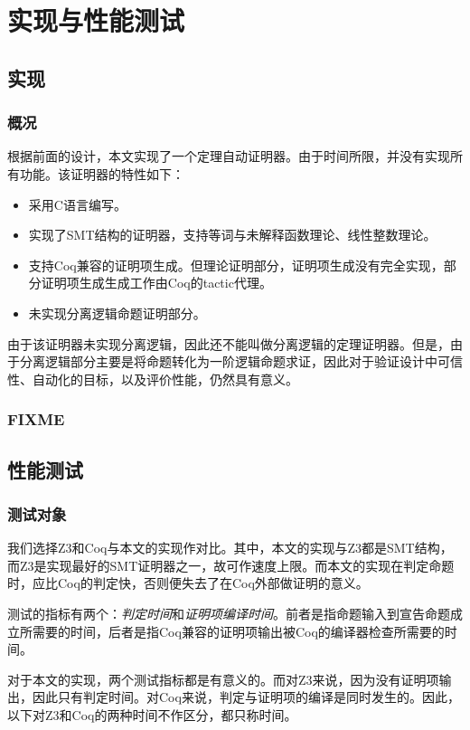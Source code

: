 \chapter{实现与性能测试}
\label{chap:test}

\section{实现}
\subsection{概况}
根据前面的设计，本文实现了一个定理自动证明器。由于时间所限，并没有实现所有功能。该证明器的特性如下：
\begin{itemize}
  \item 采用C语言编写。
  \item 实现了SMT结构的证明器，支持等词与未解释函数理论、线性整数理论。
  \item 支持Coq兼容的证明项生成。但理论证明部分，证明项生成没有完全实现，部分证明项生成生成工作由Coq的tactic代理。
  \item 未实现分离逻辑命题证明部分。
\end{itemize}

由于该证明器未实现分离逻辑，因此还不能叫做分离逻辑的定理证明器。但是，由于分离逻辑部分主要是将命题转化为一阶逻辑命题求证，因此对于验证设计中可信性、自动化的目标，以及评价性能，仍然具有意义。

\subsection{FIXME}

\section{性能测试}
\subsection{测试对象}
我们选择Z3和Coq与本文的实现作对比。其中，本文的实现与Z3都是SMT结构，而Z3是实现最好的SMT证明器之一，故可作速度上限。而本文的实现在判定命题时，应比Coq的判定快，否则便失去了在Coq外部做证明的意义。

测试的指标有两个：\emph{判定时间}和\emph{证明项编译时间}。前者是指命题输入到宣告命题成立所需要的时间，后者是指Coq兼容的证明项输出被Coq的编译器检查所需要的时间。

对于本文的实现，两个测试指标都是有意义的。而对Z3来说，因为没有证明项输出，因此只有判定时间。对Coq来说，判定与证明项的编译是同时发生的。因此，以下对Z3和Coq的两种时间不作区分，都只称时间。

